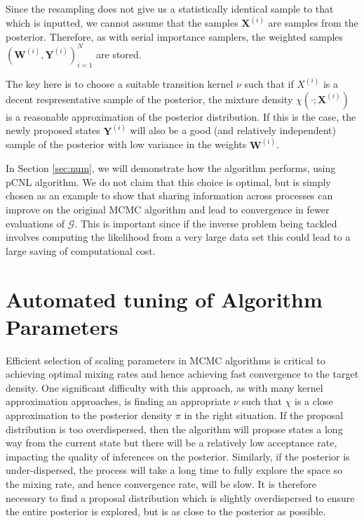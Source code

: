 \documentclass[final]{siamltex}
\newcommand{\G}{\mathcal{G}}
\newcommand{\X}{{\mathbf X}}
\newcommand{\Y}{{\mathbf Y}}
\newcommand{\W}{{\mathbf W}}
\begin{document}
Since the resampling does not give us a statistically identical sample
to that which is inputted, we cannot assume that the samples $\X^{(i)}$
are samples from the posterior. Therefore, as with serial
importance samplers, the weighted samples $(\W^{(i)},\Y^{(i)})_{i=1}^N$ are stored.

The key here is to choose a suitable transition kernel $\nu$ such that
if $X^{(i)}$ is a decent respresentative sample of the posterior,
the mixture density $\chi(\cdot;\X^{(i)})$ is a reasonable
approximation of the posterior distribution. If this is the case,
the newly proposed states $\Y^{(i)}$ will also be a good (and relatively
independent) sample of the posterior with low variance in the
weights $\W^{(i)}$.

In Section \ref{sec:num}, we will demonstrate how the algorithm
performs, using pCNL algorithm. We do not claim that this choice is optimal, but
is simply chosen as an example to show that sharing information across
processes can improve on the original MCMC algorithm and lead to
convergence in fewer evaluations of $\G$. This is important since if
the inverse problem being tackled involves computing
the likelihood from a very large data set this could lead to a
large saving of computational cost.

\section{Automated tuning of Algorithm Parameters}\label{sec:adap_delta}

Efficient selection of scaling parameters in MCMC algorithms is critical to achieving optimal mixing rates and hence achieving fast convergence to the target density. One significant difficulty with this approach, as with many kernel
approximation approaches, is finding an appropriate $\nu$ such that
$\chi$ is a close approximation to the posterior density $\pi$ in the
right situation. If the proposal distribution is too overdispersed, then the algorithm will propose states a long way from the current state but there will be a relatively low acceptance rate, impacting the quality of inferences on the posterior. Similarly, if the posterior is under-dispersed, the process will take a long time to fully explore the space so the mixing rate, and hence convergence rate, will be slow. It is therefore necessary to find a proposal distribution which is slightly overdispersed to ensure the entire posterior is explored\cite{gelman1992inference}, but is as close to the posterior as possible.
\end{document}

